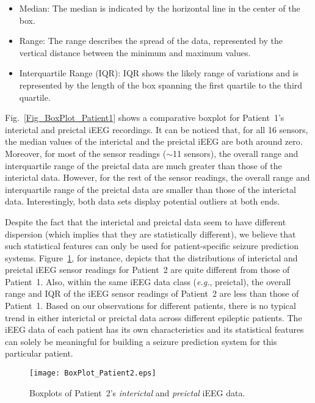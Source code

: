\documentclass[journal]{IEEEtran}
\begin{document}
\begin{itemize}
	\item Median: The median is indicated by the horizontal line in the center of the box.
	\item Range: The range describes the spread of the data, represented by the vertical distance between the minimum and maximum values. 
	\item Interquartile Range (IQR): IQR shows the likely range of variations and is represented by the length of the box spanning the first quartile to the third quartile.
\end{itemize}



Fig.~\ref{Fig_BoxPlot_Patient1} shows a comparative boxplot for Patient~1’s interictal and preictal iEEG recordings. It can be noticed that, for all 16 sensors, the median values of the interictal and the preictal iEEG are both around zero. Moreover, for most of the sensor readings ($\sim$11 sensors), the overall range and interquartile range of the preictal data are much greater than those of the interictal data. However, for the rest of the sensor readings, the overall range and interquartile range of the preictal data are smaller than those of the interictal data. Interestingly, both data sets display potential outliers at both ends.




Despite the fact that the interictal and preictal data seem to have different dispersion (which implies that they are statistically different), we believe that such statistical features can only be used for patient-specific seizure prediction systems. Figure~\ref{Fig_BoxPlot_Patient2}, for instance, depicts that the distributions of interictal and preictal iEEG sensor readings for Patient~2 are quite different from those of Patient~1. Also, within the same iEEG data class (\textit{e.g.}, preictal), the overall range and IQR of the iEEG sensor readings of Patient~2 are less than those of Patient~1. Based on our observations for different patients, there is no typical trend in either interictal or preictal data across different epileptic patients. The iEEG data of each patient has its own characteristics and its statistical features can solely be meaningful for building a seizure prediction system for this particular patient. 



\begin{figure}[!t]\centering
	\texttt{[image: BoxPlot\_Patient2.eps]}
	\caption{Boxplots of Patient~2’s \textit{interictal} and \textit{preictal} iEEG data.}
\label{Fig_BoxPlot_Patient2}
\end{figure}
\end{document}
